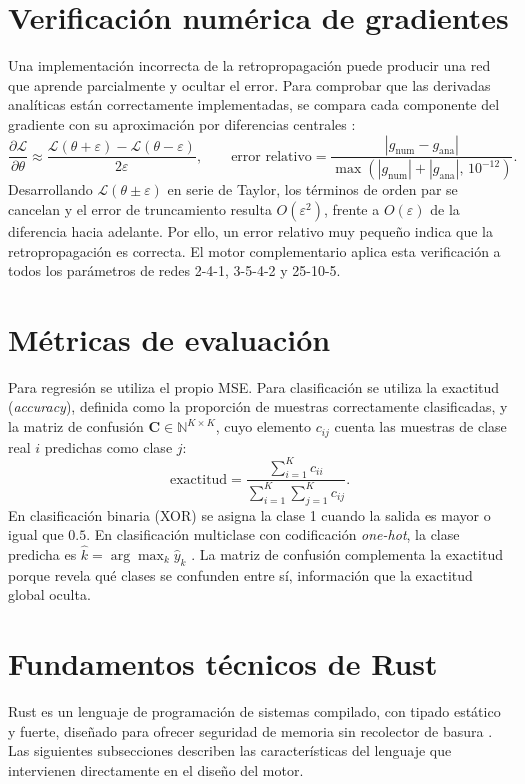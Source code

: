 \section{Verificación numérica de gradientes}
Una implementación incorrecta de la retropropagación puede producir una red que aprende parcialmente y ocultar el error. Para comprobar que las derivadas analíticas están correctamente implementadas, se compara cada componente del gradiente con su aproximación por diferencias centrales \citep{lecun1998,goodfellow2016}:
\begin{equation}
\frac{\partial\mathcal{L}}{\partial\theta} \approx \frac{\mathcal{L}(\theta+\varepsilon)-\mathcal{L}(\theta-\varepsilon)}{2\varepsilon}, \qquad \text{error relativo} = \frac{|g_{\text{num}}-g_{\text{ana}}|}{\max(|g_{\text{num}}|+|g_{\text{ana}}|,\,10^{-12})}.\label{eq:gradcheck}
\end{equation}
Desarrollando $\mathcal{L}(\theta\pm\varepsilon)$ en serie de Taylor, los términos de orden par se cancelan y el error de truncamiento resulta $O(\varepsilon^{2})$, frente a $O(\varepsilon)$ de la diferencia hacia adelante. Por ello, un error relativo muy pequeño indica que la retropropagación es correcta. El motor complementario aplica esta verificación a todos los parámetros de redes 2-4-1, 3-5-4-2 y 25-10-5.

\section{Métricas de evaluación}
Para regresión se utiliza el propio MSE. Para clasificación se utiliza la exactitud (\emph{accuracy}), definida como la proporción de muestras correctamente clasificadas, y la matriz de confusión $\mathbf{C}\in\mathbb{N}^{K\times K}$, cuyo elemento $c_{ij}$ cuenta las muestras de clase real $i$ predichas como clase $j$:
\begin{equation}
\text{exactitud} = \frac{\sum_{i=1}^{K} c_{ii}}{\sum_{i=1}^{K}\sum_{j=1}^{K} c_{ij}}.\label{eq:accuracy}
\end{equation}
En clasificación binaria (XOR) se asigna la clase 1 cuando la salida es mayor o igual que $0.5$. En clasificación multiclase con codificación \emph{one-hot}, la clase predicha es $\hat{k} = \arg\max_k \hat{y}_k$ \citep{bishop2006}. La matriz de confusión complementa la exactitud porque revela qué clases se confunden entre sí, información que la exactitud global oculta.

\section{Fundamentos técnicos de Rust}
Rust es un lenguaje de programación de sistemas compilado, con tipado estático y fuerte, diseñado para ofrecer seguridad de memoria sin recolector de basura \citep{klabnik2023,matsakis2014}. Las siguientes subsecciones describen las características del lenguaje que intervienen directamente en el diseño del motor.


